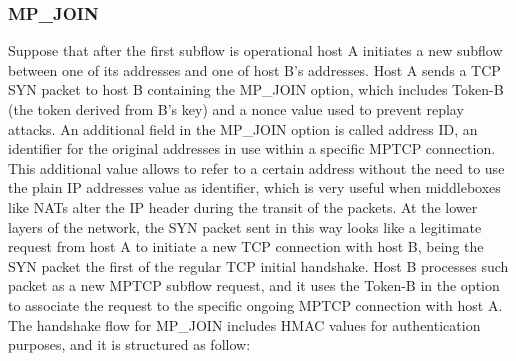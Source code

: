 \subsubsection{MP\_JOIN}
Suppose that after the first subflow is operational host A initiates a new subflow between one of its addresses and one of host B's addresses. Host A sends a TCP SYN packet to host B containing the MP\_JOIN option, which includes Token-B (the token derived from B's key) and a nonce value used to prevent replay attacks. An additional field in the MP\_JOIN option is called address ID, an identifier for the original addresses in use within a specific MPTCP connection. This additional value allows to refer to a certain address without the need to use the plain IP addresses value as identifier, which is very useful when middleboxes like NATs alter the IP header during the transit of the packets.
At the lower layers of the network, the SYN packet sent in this way looks like a legitimate request from host A to initiate a new TCP connection with host B, being the SYN packet the first of the regular TCP initial handshake. Host B processes such packet as a new MPTCP subflow request, and it uses the Token-B in the option to associate the request to the specific ongoing MPTCP connection with host A. The handshake flow for MP\_JOIN includes HMAC values for authentication purposes, and it is structured as follow:
